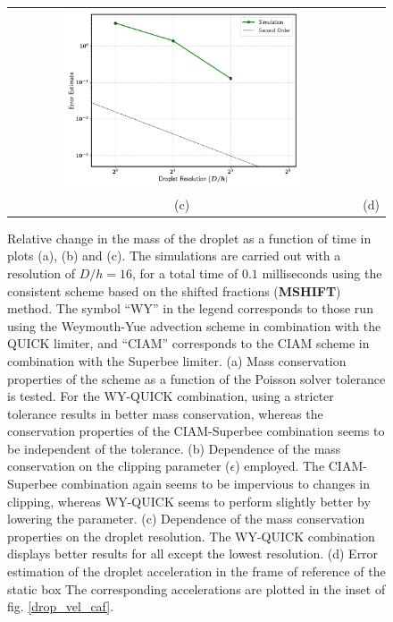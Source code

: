 \begin{figure}[h!]
\begin{center}
\begin{tabular}{cc}
\hspace{-0.2cm}%
\includegraphics[width=0.7\textwidth]{plots/raindrop/new.png} \\ 
\hspace{-0.2cm}%
(c) & (d)
\end{tabular}
\end{center}
\caption{Relative change in the mass of the droplet 
as a function of time in plots (a), (b) and (c). 
The simulations are carried out with a resolution of $D/h = 16$, 
for a total time of $0.1$ milliseconds using the consistent 
scheme based on the shifted fractions (\textbf{MSHIFT}) method. 
The symbol ``WY'' in the legend corresponds to those run using 
the Weymouth-Yue advection scheme in combination with the QUICK limiter, 
and ``CIAM'' corresponds to the CIAM scheme in combination with the Superbee limiter. 
(a) Mass conservation properties of 
the scheme as a function of the Poisson solver tolerance is tested. 
For the WY-QUICK combination, using a stricter tolerance results 
in better mass conservation, whereas the conservation properties of the 
CIAM-Superbee combination seems to be independent of the tolerance.
(b) Dependence of the mass conservation on the clipping parameter ($\epsilon$) employed. 
The CIAM-Superbee combination again seems to be impervious to changes in clipping, 
whereas WY-QUICK seems to perform slightly better by lowering the parameter.
(c) Dependence of the mass conservation properties on the droplet resolution. 
The WY-QUICK combination displays better results for all except the lowest resolution.   
(d) Error estimation of the droplet acceleration in the frame of reference of the static box
	The corresponding accelerations are plotted in the inset of fig. \ref{drop_vel_caf}.}
\label{mass_conv}
\end{figure}


